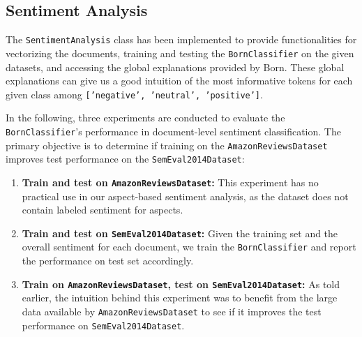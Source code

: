 \subsection{Sentiment Analysis}\label{sec:sentiment_analysis}

The \texttt{SentimentAnalysis} class has been implemented to provide functionalities for vectorizing the documents, training and testing the \texttt{BornClassifier} on the given datasets, and accessing the global explanations provided by Born. These global explanations can give us a good intuition of the most informative tokens for each given class among \texttt{['negative', 'neutral', 'positive']}.



In the following, three experiments are conducted to evaluate the \texttt{BornClassifier}'s performance in document-level sentiment classification. The primary objective is to determine if training on the \texttt{AmazonReviewsDataset} improves test performance on the \texttt{SemEval2014Dataset}:

\begin{enumerate}
    \item \textbf{Train and test on \texttt{AmazonReviewsDataset}:} This experiment has no practical use in our aspect-based sentiment analysis, as the dataset does not contain labeled sentiment for aspects.
    
    \item \textbf{Train and test on \texttt{SemEval2014Dataset}:} Given the training set and the overall sentiment for each document, we train the \texttt{BornClassifier} and report the performance on test set accordingly.
    
    \item \textbf{Train on \texttt{AmazonReviewsDataset}, test on \texttt{SemEval2014Dataset}:} As told earlier, the intuition behind this experiment was to benefit from the large data available by \texttt{AmazonReviewsDataset} to see if it improves the test performance on \texttt{SemEval2014Dataset}.
\end{enumerate}


